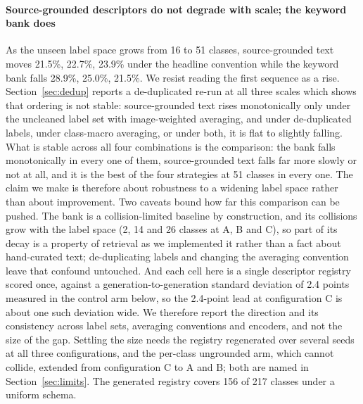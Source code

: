 \documentclass[a4paper,fleqn]{cas-dc}
\begin{document}
\paragraph{Source-grounded descriptors do not degrade with scale; the keyword bank does} As the
unseen label space grows from 16 to 51 classes, source-grounded text moves 21.5\%, 22.7\%, 23.9\%
under the headline convention while the keyword bank falls 28.9\%, 25.0\%, 21.5\%. We resist
reading the first sequence as a rise. Section~\ref{sec:dedup} reports a de-duplicated re-run at
all three scales which shows that ordering is not stable: source-grounded text rises monotonically
only under the uncleaned label set with image-weighted averaging, and under de-duplicated labels,
under class-macro averaging, or under both, it is flat to slightly falling. What is stable across
all four combinations is the comparison: the bank falls monotonically in every one of them,
source-grounded text falls far more slowly or not at all, and it is the best of the four strategies
at 51 classes in every one. The claim we make is therefore about robustness to a widening label
space rather than about improvement.
Two caveats bound how far this comparison can be pushed. The bank is a
collision-limited baseline by construction, and its collisions grow with the label space (2, 14 and
26 classes at A, B and C), so part of its decay is a property of retrieval as we implemented it
rather than a fact about hand-curated text; de-duplicating labels and changing the averaging
convention leave that confound untouched. And each cell here is a single descriptor registry scored
once, against a generation-to-generation standard deviation of 2.4 points measured in the control
arm below, so the 2.4-point lead at configuration C is about one such deviation wide. We therefore
report the direction and its consistency across label sets, averaging conventions and encoders, and
not the size of the gap. Settling the size needs the registry regenerated over several seeds at all
three configurations, and the per-class ungrounded arm, which cannot collide, extended from
configuration C to A and B; both are named in Section~\ref{sec:limits}.
The generated registry covers 156 of 217 classes under a uniform schema.
\end{document}
